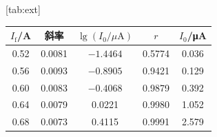 [tab:ext]{
\begin{tabular}{ccccc}
\toprule
$I_\mathrm{f}$/A & 斜率 & $\lg(I_0/\mu\mathrm{A})$ & $r$ & $I_0$/μA \\
\midrule
0.52 & 0.0081 & $-1.4464$ & 0.5774 & 0.036 \\
0.56 & 0.0093 & $-0.8905$ & 0.9421 & 0.129 \\
0.60 & 0.0083 & $-0.4068$ & 0.9879 & 0.392 \\
0.64 & 0.0079 & 0.0221 & 0.9980 & 1.052 \\
0.68 & 0.0073 & 0.4115 & 0.9991 & 2.579 \\
\bottomrule
\end{tabular}}
